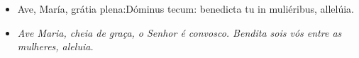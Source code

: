 \begin{paracol}{2}
  \begin{itemize}
    \item[\Antiphona] Ave, María, grátia plena:Dóminus tecum: benedicta tu in muliéribus, allelúia.
      \switchcolumn
    \item[\Antiphona] \emph{Ave Maria, cheia de graça, o Senhor é convosco. Bendita sois vós entre as mulheres, aleluia.}
  \end{itemize}
\end{paracol}

